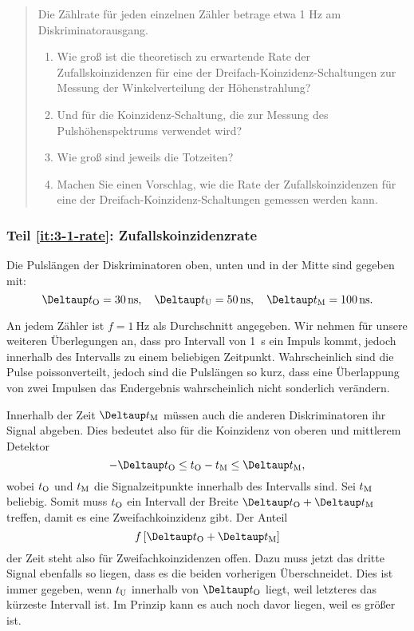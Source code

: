 \documentclass[11pt, ngerman, fleqn, DIV=15, headinclude, BCOR=2cm]{scrreprt}
\begin{document}
\begin{quote}
    Die Zählrate für jeden einzelnen Zähler betrage etwa 1 Hz am
    Diskriminatorausgang.
    \begin{enumerate}
        \item
            \label{it:3-1-rate}
            Wie groß ist die theoretisch zu erwartende Rate der
            Zufallskoinzidenzen für eine der Dreifach-Koinzidenz-Schaltungen
            zur Messung der Winkelverteilung der Höhenstrahlung?

        \item
            \label{it:3-1-puls}
            Und für die Koinzidenz-Schaltung, die zur Messung des
            Pulshöhenspektrums verwendet wird?

        \item
            \label{it:3-1-tot}
            Wie groß sind jeweils die Totzeiten? 

        \item
            \label{it:3-1-vorschlag}
            Machen Sie einen Vorschlag, wie die Rate der Zufallskoinzidenzen
            für eine der Dreifach-Koinzidenz-Schaltungen gemessen werden kann.
    \end{enumerate}
\end{quote}

\subsubsection{Teil \ref{it:3-1-rate}: Zufallskoinzidenzrate}

\newcommand\DtM{\Deltaup t_\text M}
\newcommand\DtO{\Deltaup t_\text O}
\newcommand\DtU{\Deltaup t_\text U}

Die Pulslängen der Diskriminatoren oben, unten und in der Mitte sind gegeben
mit:
\[
    \DtO = \SI{30}{\nano\second}
    \eqnsep
    \DtU = \SI{50}{\nano\second}
    \eqnsep
    \DtM = \SI{100}{\nano\second}.
\]

An jedem Zähler ist $f = \SI{1}{\hertz}$ als Durchschnitt angegeben. Wir nehmen
für unsere weiteren Überlegungen an, dass pro Intervall von \SI{1}{\second} ein
Impuls kommt, jedoch innerhalb des Intervalls zu einem beliebigen Zeitpunkt.
Wahrscheinlich sind die Pulse poissonverteilt, jedoch sind die Pulslängen so
kurz, dass eine Überlappung von zwei Impulsen das Endergebnis wahrscheinlich
nicht sonderlich verändern.

Innerhalb der Zeit $\DtM$ müssen auch die anderen Diskriminatoren ihr Signal
abgeben. Dies bedeutet also für die Koinzidenz von oberen und mittlerem
Detektor
\[
    - \DtO \leq t_\text O - t_\text M \leq \DtM,
\]
wobei $t_\text O$ und $t_\text M$ die Signalzeitpunkte innerhalb des Intervalls
sind. Sei $t_\text M$ beliebig. Somit muss $t_\text O$ ein Intervall der Breite
$\DtO + \DtM$ treffen, damit es eine Zweifachkoinzidenz gibt. Der Anteil
\[
    f \sbr{\DtO + \DtM}
\]
der Zeit steht also für Zweifachkoinzidenzen offen. Dazu muss jetzt das dritte
Signal ebenfalls so liegen, dass es die beiden vorherigen Überschneidet. Dies
ist immer gegeben, wenn $t_\text U$ innerhalb von $\DtO$ liegt, weil letzteres
das kürzeste Intervall ist. Im Prinzip kann es auch noch davor liegen, weil es
größer ist.
\end{document}
